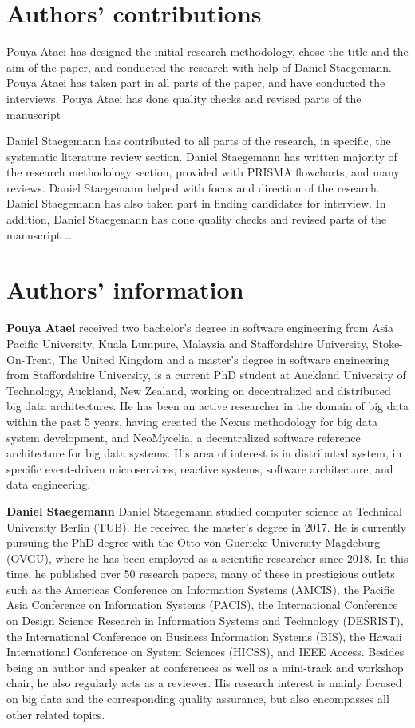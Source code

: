 \documentclass{bmcart}
\begin{document}
\begin{backmatter}
\section*{Authors' contributions}
Pouya Ataei has designed the initial research methodology, chose the title and the aim of the paper, and conducted the research with help of Daniel Staegemann. Pouya Ataei has taken part in all parts of the paper, and have conducted the interviews. Pouya Ataei has done quality checks and revised parts of the manuscript


Daniel Staegemann has contributed to all parts of the research, in specific, the systematic literature review section. Daniel Staegemann has written majority of the research methodology section, provided with PRISMA flowcharts, and many reviews. Daniel Staegemann helped with focus and direction of the research. Daniel Staegemann has also taken part in finding candidates for interview. In addition, Daniel Staegemann has done quality checks and revised parts of the manuscript
 \ldots

\section*{Authors' information}%
\textbf{Pouya Ataei} received two bachelor’s degree in
software engineering from Asia Pacific University,
Kuala Lumpure, Malaysia and Staffordshire University,
Stoke-On-Trent, The United Kingdom and
a master’s degree in software engineering from
Staffordshire University, is a current PhD student
at Auckland University of Technology, Auckland,
New Zealand, working on decentralized and distributed
big data architectures. He has been an
active researcher in the domain of big data within
the past 5 years, having created the Nexus methodology for big data system
development, and NeoMycelia, a decentralized software reference architecture
for big data systems. His area of interest is in distributed system, in
specific event-driven microservices, reactive systems, software architecture,
and data engineering.

\textbf{Daniel Staegemann} Daniel Staegemann studied computer science at Technical University Berlin (TUB). He received the master’s degree in 2017. He is currently pursuing the PhD degree with the Otto-von-Guericke University Magdeburg (OVGU), where he has been employed as a scientific researcher since 2018. In this time, he published over 50 research papers, many of these in prestigious outlets such as the Americas Conference on Information Systems (AMCIS), the Pacific Asia Conference on Information Systems (PACIS), the International Conference on Design Science Research in Information Systems and Technology (DESRIST), the International Conference on Business Information Systems (BIS), the Hawaii International Conference on System Sciences (HICSS), and IEEE Access. Besides being an author and speaker at conferences as well as a mini-track and workshop chair, he also regularly acts as a reviewer. His research interest is mainly focused on big data and the corresponding quality assurance, but also encompasses all other related topics.


\end{backmatter}
\end{document}

